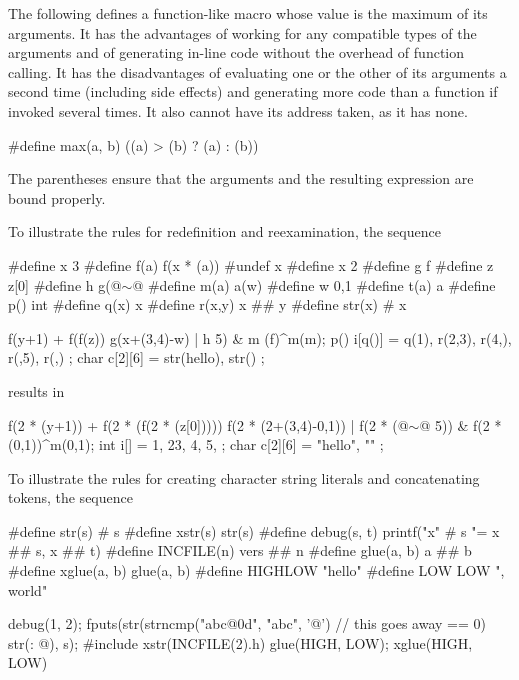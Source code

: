 \pnum
The following defines a function-like
macro whose value is the maximum of its arguments.
It has the advantages of working for any compatible types of the arguments
and of generating in-line code without the overhead of function calling.
It has the disadvantages of evaluating one or the other of its arguments
a second time
(including
%
side effects)
and generating more code than a function if invoked several times.
It also cannot have its address taken,
as it has none.

\begin{codeblock}
#define max(a, b) ((a) > (b) ? (a) : (b))
\end{codeblock}

The parentheses ensure that the arguments and
the resulting expression are bound properly.

\pnum
To illustrate the rules for redefinition and reexamination,
the sequence

\begin{codeblock}
#define x       3
#define f(a)    f(x * (a))
#undef  x
#define x       2
#define g       f
#define z       z[0]
#define h       g(@$\sim$@
#define m(a)    a(w)
#define w       0,1
#define t(a)    a
#define p()     int
#define q(x)    x
#define r(x,y)  x ## y
#define str(x)  # x

f(y+1) + f(f(z)) %
g(x+(3,4)-w) | h 5) & m
    (f)^m(m);
p() i[q()] = { q(1), r(2,3), r(4,), r(,5), r(,) };
char c[2][6] = { str(hello), str() };
\end{codeblock}

results in

\begin{codeblock}
f(2 * (y+1)) + f(2 * (f(2 * (z[0])))) %
f(2 * (2+(3,4)-0,1)) | f(2 * (@$\sim$@ 5)) & f(2 * (0,1))^m(0,1);
int i[] = { 1, 23, 4, 5, };
char c[2][6] = { "hello", "" };
\end{codeblock}

\pnum
To illustrate the rules for creating character string literals
and concatenating tokens,
the sequence

\begin{codeblock}
#define str(s)      # s
#define xstr(s)     str(s)
#define debug(s, t) printf("x" # s "= %
               x ## s, x ## t)
#define INCFILE(n)  vers ## n
#define glue(a, b)  a ## b
#define xglue(a, b) glue(a, b)
#define HIGHLOW     "hello"
#define LOW         LOW ", world"

debug(1, 2);
fputs(str(strncmp("abc@\textbackslash@0d", "abc", '@')  // this goes away
    == 0) str(: @\atsign\textbackslash@n), s);
#include xstr(INCFILE(2).h)
glue(HIGH, LOW);
xglue(HIGH, LOW)
\end{codeblock}

